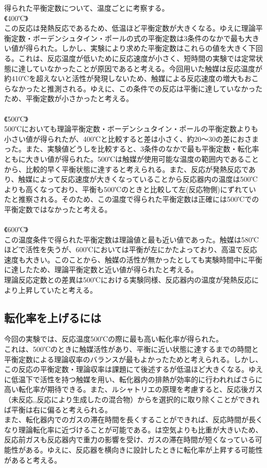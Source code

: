 \documentclass{ltjsarticle}
\begin{document}
得られた平衡定数について、温度ごとに考察する。\\
《400℃》\\
この反応は発熱反応であるため、低温ほど平衡定数が大きくなる。ゆえに理論平衡定数・ボーデンシュタイン・ポールの式の平衡定数は3条件のなかで最も大きい値が得られた。しかし、実験により求めた平衡定数はこれらの値を大きく下回る。これは、反応温度が低いために反応速度が小さく、短時間の実験では定常状態に達していなかったことが原因であると考える。今回用いた触媒は反応温度が約410℃を超えないと活性が発現しないため、触媒による反応速度の増大もおこらなかったと推測される。ゆえに、この条件での反応は平衡に達していなかったため、平衡定数が小さかったと考える。\\
\\
《500℃》\\
500℃においても理論平衡定数・ボーデンシュタイン・ポールの平衡定数よりも小さい値が得られたが、400℃と比較すると差は小さく、約20～30の差におさまった。また、実験値どうしを比較すると、3条件のなかで最も平衡定数・転化率ともに大きい値が得られた。500℃は触媒が使用可能な温度の範囲内であることから、比較的早く平衡状態に達すると考えられる。また、反応が発熱反応であり、触媒によって反応速度が大きくなっていることから反応器内の温度は500℃よりも高くなっており、平衡も500℃のときと比較して左(反応物側)にずれていたと推察される。そのため、この温度で得られた平衡定数は正確には500℃での平衡定数ではなかったと考える。\\
\\
《600℃》\\
この温度条件で得られた平衡定数は理論値と最も近い値であった。触媒は580℃ほどで活性を失うが、600℃においては平衡が左にかたよっており、高温で反応速度も大きい。このことから、触媒の活性が無かったとしても実験時間中に平衡に達したため、理論平衡定数と近い値が得られたと考える。\\理論反応定数との差異は500℃における実験同様、反応器内の温度が発熱反応により上昇していたと考える。

\subsection{転化率を上げるには}

今回の実験では、反応温度500℃の際に最も高い転化率が得られた。\\
これは、500℃のときに触媒活性があり、平衡に近い状態に達するまでの時間と平衡定数による理論収率のバランスが最もよかったためと考えられる。しかし、この反応の平衡定数・理論収率は課題にて後述するが低温ほど大きくなる。ゆえに低温下で活性を持つ触媒を用い、転化器内の排熱が効率的に行われればさらに高い転化率が期待できる。また、ルシャトリエの原理を考慮すると、反応後ガス（未反応,,反応により生成したの混合物）からを選択的に取り除くことができれば平衡は右に偏ると考えられる。\\また、転化器内でのガスの滞在時間を長くすることができれば、反応時間が長くなり理論転化率に近づけることが可能である。は空気よりも比重が大きいため、反応前ガスも反応器内で重力の影響を受け、ガスの滞在時間が短くなっている可能性がある。ゆえに、反応器を横向きに設計したときに転化率が上昇する可能性があると考える。
\end{document}
